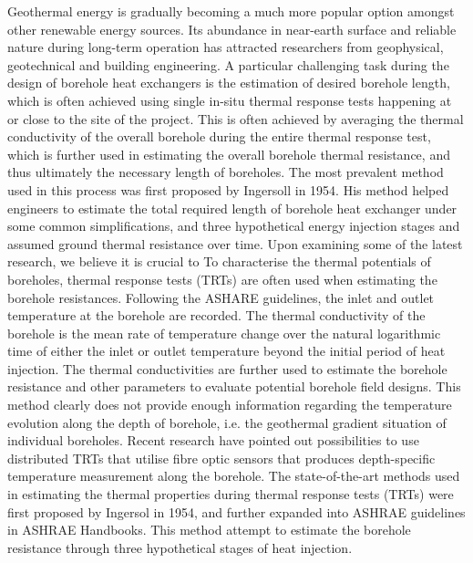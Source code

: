 Geothermal energy is gradually becoming a much more popular option amongst other renewable energy sources. Its abundance in near-earth surface and reliable nature during long-term operation has attracted researchers from geophysical, geotechnical and building engineering. A particular challenging task during the design of borehole heat exchangers is the estimation of desired borehole length, which is often achieved using single in-situ thermal response tests happening at or close to the site of the project. This is often achieved by averaging the thermal conductivity of the overall borehole during the entire thermal response test, which is further used in estimating the overall borehole thermal resistance, and thus ultimately the necessary length of boreholes. The most prevalent method used in this process was first proposed by Ingersoll in 1954. His method helped engineers to estimate the total required length of borehole heat exchanger under some common simplifications, and three hypothetical energy injection stages and assumed ground thermal resistance over time. Upon examining some of the latest research, we believe it is crucial to  
To characterise the thermal potentials of boreholes, thermal response tests (TRTs) are often used when estimating the borehole resistances. Following the ASHARE guidelines, the inlet and outlet temperature at the borehole are recorded. The thermal conductivity of the borehole is the mean rate of temperature change over the natural logarithmic time of either the inlet or outlet temperature beyond the initial period of heat injection. The thermal conductivities are further used to estimate the borehole resistance and other parameters to evaluate potential borehole field designs. This method clearly does not provide enough information regarding the temperature evolution along the depth of borehole, i.e. the geothermal gradient situation of individual boreholes. Recent research have pointed out possibilities to use distributed TRTs that utilise fibre optic sensors that produces depth-specific temperature measurement along the borehole.  
The state-of-the-art methods used in estimating the thermal properties during thermal response tests (TRTs) were first proposed by Ingersol in 1954, and further expanded into ASHRAE guidelines in ASHRAE Handbooks. This method attempt to estimate the borehole resistance through three hypothetical stages of heat injection.  